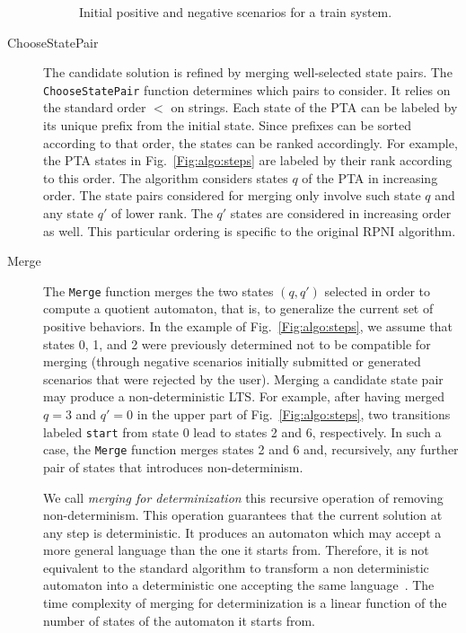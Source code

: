 \begin{description}
\begin{figure}
\caption{Initial positive and negative scenarios for a train system\label{Fig:init:scen}.}
\end{figure}

\item[ChooseStatePair] The candidate solution is refined by merging well-selected state pairs. The \texttt{ChooseStatePair} function determines which pairs to consider. It relies on the standard order $<$ on strings. Each state of the PTA can be labeled by its unique prefix from the initial state. Since prefixes can be sorted according to that order, the states can be ranked accordingly. For example, the PTA states in Fig.~\ref{Fig:algo:steps} are labeled by their rank according to this order. The algorithm considers states $q$ of the PTA in increasing order. The state pairs considered for merging only involve such state $q$ and any state $q'$ of lower rank. The $q'$ states are considered in increasing order as well. This particular ordering is specific to the original RPNI algorithm.

\item[Merge] The \texttt{Merge} function merges the two states $(q, q')$ selected in order to compute a quotient automaton, that is, to generalize the current set of positive behaviors. In the example of Fig.~\ref{Fig:algo:steps}, we assume that states 0, 1, and 2 were previously determined not to be compatible for merging (through negative scenarios initially submitted or generated scenarios that were rejected by the user). Merging a candidate state pair may produce a non-deterministic LTS. For example, after having merged $q = 3$ and $q' = 0$ in the upper part of Fig.~\ref{Fig:algo:steps}, two transitions labeled \texttt{start} from state 0 lead to states 2 and 6, respectively. In such a case, the \texttt{Merge} function merges states 2 and 6 and, recursively, any further pair of states that introduces non-determinism. 

We call \textsl{merging for determinization} this recursive operation of removing non-determinism. This operation guarantees that the current solution at any step is deterministic. It produces an automaton which may accept a more general language than the one it starts from. Therefore, it is not equivalent to the standard algorithm to transform a non deterministic automaton into a deterministic one accepting the same language~\cite{Hopcroft:1979}. The time complexity of merging for determinization is a linear function of the number of states of the automaton it starts from. 


\end{description}
